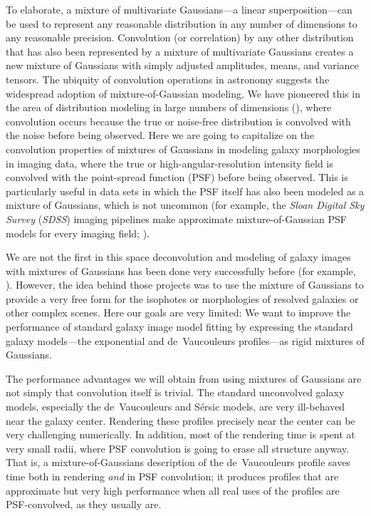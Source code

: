 \documentclass[12pt,pdftex,preprint]{aastex}
\newcommand{\project}[1]{\textsl{#1}}
\newcommand{\sdss}{\project{SDSS}}
\begin{document}
To elaborate, a mixture of multivariate Gaussians---a linear
superposition---can be used to represent any reasonable distribution
in any number of dimensions to any reasonable precision.  Convolution
(or correlation) by any other distribution that has also been
represented by a mixture of multivariate Gaussians creates a new
mixture of Gaussians with simply adjusted amplitudes, means, and
variance tensors.  The ubiquity of convolution operations in astronomy
suggests the widespread adoption of mixture-of-Gaussian modeling.  We
have pioneered this in the area of distribution modeling in large
numbers of dimensions (\citealt{xd, xdqso, xdqsoz}), where convolution
occurs because the true or noise-free distribution is convolved with
the noise before being observed.  Here we are going to capitalize on
the convolution properties of mixtures of Gaussians in modeling galaxy
morphologies in imaging data, where the true or
high-angular-resolution intensity field is convolved with the
point-spread function (PSF) before being observed.  This is
particularly useful in data sets in which the PSF itself has also been
modeled as a mixture of Gaussians, which is not uncommon (for example,
the \project{Sloan Digital Sky Survey} (\sdss) imaging pipelines
make approximate mixture-of-Gaussian PSF models for
every imaging field; \citealt{lupton}).

We are not the first in this space deconvolution and modeling of
galaxy images with mixtures of Gaussians has been done very
successfully before (for example, \citealt{bendinelli, emsellem,
  bendinelli2, cappellari}).  However, the idea behind those projects
was to use the mixture of Gaussians to provide a very free form for
the isophotes or morphologies of resolved galaxies or other complex
scenes.  Here our goals are very limited: We want to improve the
performance of standard galaxy image model fitting by expressing the
standard galaxy models---the exponential and de~Vaucouleurs
profiles---as rigid mixtures of Gaussians.

The performance advantages we will obtain from using mixtures of
Gaussians are not simply that convolution itself is trivial.  The
standard unconvolved galaxy models, especially the de~Vaucouleurs and
S\'ersic models, are very ill-behaved near the galaxy center.
Rendering these profiles precisely near the center can be very
challenging numerically.  In addition, most of the rendering time is
spent at very small radii, where PSF convolution is going to erase all
structure anyway.  That is, a mixture-of-Gaussians description of the
de~Vaucouleurs profile saves time both in rendering \emph{and} in PSF
convolution; it produces profiles that are approximate but very high
performance when all real uses of the profiles are PSF-convolved, as
they usually are.
\end{document}
